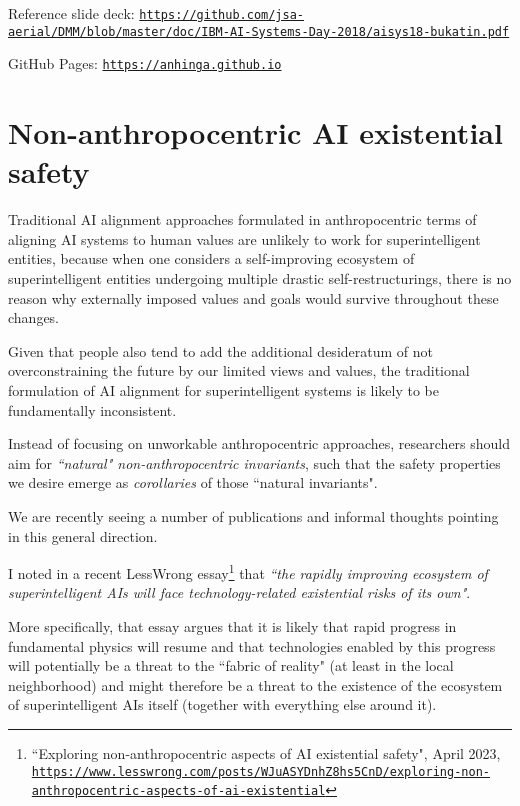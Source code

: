 \documentclass{article}
\begin{document}
Reference slide deck: \href{https://github.com/jsa-aerial/DMM/blob/master/doc/IBM-AI-Systems-Day-2018/aisys18-bukatin.pdf}{\scriptsize\tt https://github.com/jsa-aerial/DMM/blob/master/doc/IBM-AI-Systems-Day-2018/aisys18-bukatin.pdf}

GitHub Pages: \href{https://anhinga.github.io/}{\tt https://anhinga.github.io}

\pagebreak

\section{Non-anthropocentric AI existential safety}\label{sec:nonanthro}

Traditional AI alignment approaches formulated in anthropocentric terms of
aligning AI systems to human values are unlikely to work for superintelligent entities, 
because when one considers a self-improving ecosystem of superintelligent entities 
undergoing multiple drastic self-restructurings, there is no reason why
externally imposed values and goals would survive throughout these changes.

Given that people also tend to add the additional desideratum of not overconstraining
the future by our limited views and values, the traditional formulation of AI alignment for superintelligent
systems is likely to be fundamentally inconsistent.

Instead of focusing on unworkable anthropocentric approaches, researchers
should aim for {\em ``natural" non-anthropocentric invariants}, such that the safety properties we desire emerge as
{\em corollaries} of those ``natural invariants".

We are recently seeing a number of publications and informal thoughts pointing in this
general direction.

I noted in a recent LessWrong
essay\footnote{``Exploring non-anthropocentric aspects of AI existential safety", April 2023,\\
\href{https://www.lesswrong.com/posts/WJuASYDnhZ8hs5CnD/exploring-non-anthropocentric-aspects-of-ai-existential}
{\tt https://www.lesswrong.com/posts/WJuASYDnhZ8hs5CnD/exploring-non-anthropocentric-aspects-of-ai-existential}}
that {\em ``the rapidly improving ecosystem of superintelligent AIs will face technology-related existential risks of its own"}.

More specifically, that essay argues that it is likely that rapid progress in fundamental physics will resume
and that technologies enabled by this progress will potentially be a threat to the ``fabric of reality" (at least
in the local neighborhood) and might therefore be a threat to the existence of the ecosystem of superintelligent AIs 
itself (together with everything else around it).
\end{document}
